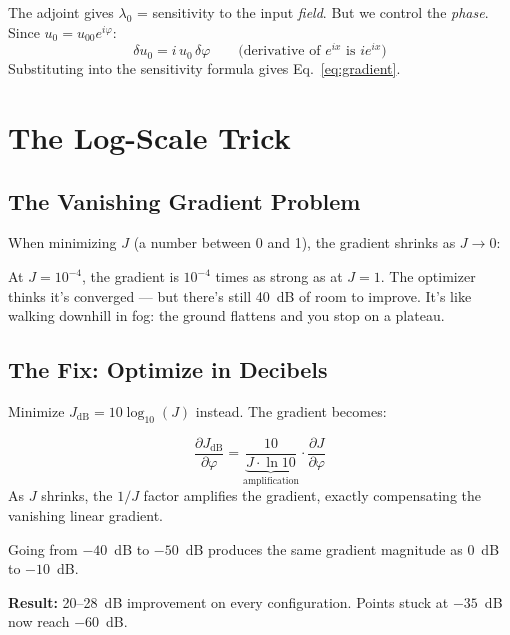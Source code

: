 \documentclass[12pt,a4paper]{article}
\newcommand{\pdv}[2]{\frac{\partial #1}{\partial #2}}
\begin{document}
The adjoint gives $\lambda_0$ = sensitivity to the input \emph{field}. But we control the \emph{phase}. Since $u_0 = u_{00}e^{i\varphi}$:
\begin{equation}
\delta u_0 = i\,u_0\,\delta\varphi \qquad\text{(derivative of $e^{ix}$ is $ie^{ix}$)}
\end{equation}
Substituting into the sensitivity formula gives Eq.~\eqref{eq:gradient}.


\section{The Log-Scale Trick}

\subsection{The Vanishing Gradient Problem}

When minimizing $J$ (a number between 0 and 1), the gradient shrinks as $J \to 0$:

\begin{warning}
At $J = 10^{-4}$, the gradient is $10^{-4}$ times as strong as at $J = 1$. The optimizer thinks it's converged --- but there's still 40~dB of room to improve. It's like walking downhill in fog: the ground flattens and you stop on a plateau.
\end{warning}

\subsection{The Fix: Optimize in Decibels}

Minimize $J_{\text{dB}} = 10\log_{10}(J)$ instead. The gradient becomes:
\begin{keyeq}
\begin{equation}
\pdv{J_{\text{dB}}}{\varphi} = \underbrace{\frac{10}{J\cdot\ln 10}}_{\text{amplification}} \cdot \pdv{J}{\varphi}
\label{eq:log_cost}
\end{equation}
As $J$ shrinks, the $1/J$ factor amplifies the gradient, exactly compensating the vanishing linear gradient.
\end{keyeq}

Going from $-40$~dB to $-50$~dB produces the same gradient magnitude as $0$~dB to $-10$~dB.

\textbf{Result:} 20--28~dB improvement on every configuration. Points stuck at $-35$~dB now reach $-60$~dB.
\end{document}
